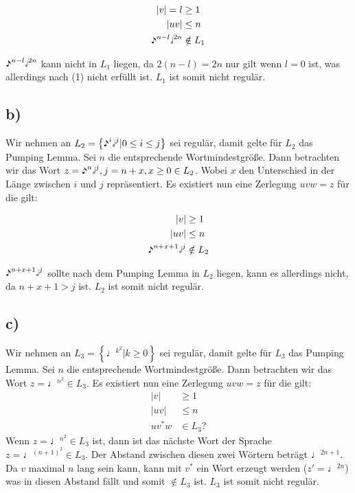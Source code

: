 \documentclass{article}
\begin{document}
\begin{align}
|v| = l &\geq 1\\
|uv| &\leq n\\
\eighthnote^{n-l}\halfnote^{2n} &\notin L_1
\end{align}

$\eighthnote^{n-l}\halfnote^{2n}$ kann nicht in $L_1$ liegen, da $2(n-l) = 2n$ nur gilt wenn $l=0$ ist, was allerdings nach (1) nicht erfüllt ist. $L_1$ ist somit nicht regulär.
\setcounter{equation}{0}


\subsection*{b)}
Wir nehmen an $L_2=\left\{\eighthnote^i\halfnote^j | 0\leq i \leq j\right\}$ sei regulär, damit gelte für $L_2$ das Pumping Lemma. Sei $n$ die entsprechende Wortmindestgröße. Dann betrachten wir das Wort $z=\eighthnote^n\halfnote^j, j = n + x, x \geq 0 \in L_2$. Wobei $x$ den Unterschied in der Länge zwischen $i$ und $j$ repräsentiert. Es existiert nun eine Zerlegung $uvw=z$ für die gilt:

\begin{align}
|v| &\geq 1\\
|uv| &\leq n\\
\eighthnote^{n+x+1}\halfnote^{j} &\notin L_2
\end{align}

$\eighthnote^{n+x+1}\halfnote^{j}$ sollte nach dem Pumping Lemma in $L_2$ liegen, kann es allerdings nicht, da $n+x+1 > j $ ist. $L_2$ ist somit nicht regulär.
\setcounter{equation}{0}


\subsection*{c)}
Wir nehmen an $L_3=\left\{\quarternote^{k^2}| k\geq0 \right\}$ sei regulär, damit gelte für $L_3$ das Pumping Lemma. Sei $n$ die entsprechende Wortmindestgröße. Dann betrachten wir das Wort $z=\quarternote^{n^2} \in L_3$. Es existiert nun eine Zerlegung $uvw=z$ für die gilt:
\begin{align}
|v| &\geq 1\\
|uv| &\leq n\\
uv^*w &\in L_3 ?
\end{align}
Wenn $z=\quarternote^{n^2} \in L_3$ ist, dann ist das nächste Wort der Sprache $z=\quarternote^{(n+1)^2} \in L_3$. Der Abstand zwischen diesen zwei Wörtern beträgt $\quarternote^{2n+1}$. Da $v$ maximal $n$ lang sein kann, kann mit $v^*$ ein Wort erzeugt werden ($z'=\quarternote^{2n}$) was in diesen Abstand fällt und somit $\notin L_3$ ist. $L_3$ ist somit nicht regulär.
\end{document}
